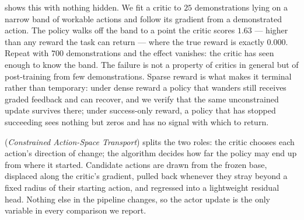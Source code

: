  shows this with nothing hidden. We fit a critic to $25$
demonstrations lying on a narrow band of workable actions and follow its
gradient from a demonstrated action. The policy walks off the band to a point
the critic scores $1.63$ --- higher than any reward the task can return ---
where the true reward is exactly $0.000$. Repeat with $700$ demonstrations and
the effect vanishes: the critic has seen enough to know the band. The failure is
not a property of critics in general but of post-training from few
demonstrations. Sparse reward is what makes it terminal rather than temporary:
under dense reward a policy that wanders still receives graded feedback and can
recover, and we verify that the same unconstrained update survives there; under
success-only reward, a policy that has stopped succeeding sees nothing but
zeros and has no signal with which to return.

\method{} (\emph{Constrained Action-Space Transport}) splits the two roles:
the critic chooses each action's direction of change; the algorithm decides
how far the policy may end up from where it started. Candidate actions are
drawn from the frozen base, displaced along the critic's gradient, pulled
back whenever they stray beyond a fixed radius of their starting action, and
regressed into a lightweight residual head. Nothing else in the pipeline
changes, so the actor update is the only variable in every comparison we
report.

